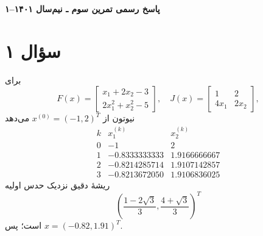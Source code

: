\documentclass[12pt]{article}
\begin{document}
\begin{center}{\Large\textbf{پاسخ رسمی تمرین سوم ـ نیم‌سال ۱۴۰۱--۱}}\end{center}

\section*{سؤال ۱}
برای
\[
 F(x)=\begin{bmatrix}x_1+2x_2-3\\2x_1^2+x_2^2-5\end{bmatrix},
 \quad J(x)=\begin{bmatrix}1&2\\4x_1&2x_2\end{bmatrix},
\]
نیوتون از \(x^{(0)}=(-1,2)^T\) می‌دهد
\[
\begin{array}{c|rr}
k&x_1^{(k)}&x_2^{(k)}\\ \hline
0&-1&2\\1&-0.8333333333&1.9166666667\\
2&-0.8214285714&1.9107142857\\3&-0.8213672050&1.9106836025
\end{array}
\]
ریشهٔ دقیق نزدیک حدس اولیه
\[
 \left(\frac{1-2\sqrt3}{3},\frac{4+\sqrt3}{3}\right)^T
\]
است؛ پس \(\boxed{x=(-0.82,1.91)^T}\).
\end{document}
